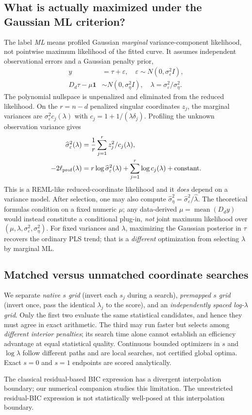 \subsection{What is actually maximized under the Gaussian ML criterion?}
The label \emph{ML} means profiled Gaussian \emph{marginal} variance-component likelihood, not pointwise maximum likelihood of the fitted curve. It assumes independent observational errors and a Gaussian penalty prior,
\begin{equation}\label{eq:gauss}
\begin{aligned}
y&=\tau+\varepsilon,\quad
\varepsilon\sim N(0,\sigma_\varepsilon^2I),\\
D_d\tau-\mu\mathbf1&\sim N(0,\sigma_\eta^2I),\quad
\lambda=\sigma_\varepsilon^2/\sigma_\eta^2.
\end{aligned}
\end{equation}
The polynomial nullspace is unpenalized and eliminated from the reduced likelihood. On the $r=n-d$ penalized singular coordinates $z_j$, the marginal variances are $\sigma_\varepsilon^2c_j(\lambda)$ with $c_j=1+1/(\lambda\delta_j)$. Profiling the unknown observation variance gives
\begin{equation}\label{eq:profileml}
\begin{aligned}
\widehat\sigma_\varepsilon^2(\lambda)
&=\frac1r\sum_{j=1}^r z_j^2/c_j(\lambda),\\
-2\ell_{\rm prof}(\lambda)
&=r\log\widehat\sigma_\varepsilon^2(\lambda)
 +\sum_{j=1}^r\log c_j(\lambda)+\mathrm{constant}.
\end{aligned}
\end{equation}
This is a REML-like reduced-coordinate likelihood and it \emph{does} depend on a variance model. After selection, one may also compute $\widehat\sigma_\eta^2=\widehat\sigma_\varepsilon^2/\widehat\lambda$. The theoretical formulas condition on a fixed numeric $\mu$; any data-derived $\mu=\operatorname{mean}(D_dy)$ would instead constitute a conditional plug-in, \emph{not} joint maximum likelihood over $(\mu,\lambda,\sigma_\varepsilon^2,\sigma_\eta^2)$. For fixed variances and $\lambda$, maximizing the Gaussian posterior in $\tau$ recovers the ordinary PLS trend; that is a \emph{different} optimization from selecting $\lambda$ by marginal ML.

\subsection{Matched versus unmatched coordinate searches}
We separate \emph{native $s$ grid} (invert each $s_j$ during a search), \emph{premapped $s$ grid} (invert once, pass the identical $\lambda_j$ to the score), and an \emph{independently spaced log-$\lambda$ grid}. Only the first two evaluate the same statistical candidates, and hence they must agree in exact arithmetic. The third may run faster but selects among \emph{different interior penalties}; its search time alone cannot establish an efficiency advantage at equal statistical quality. Continuous bounded optimizers in $s$ and $\log\lambda$ follow different paths and are local searches, not certified global optima. Exact $s=0$ and $s=1$ endpoints are scored analytically.

The classical residual-based BIC expression has a divergent interpolation boundary; our numerical companion studies this limitation. The unrestricted residual-BIC expression is not statistically well-posed at this interpolation boundary.

